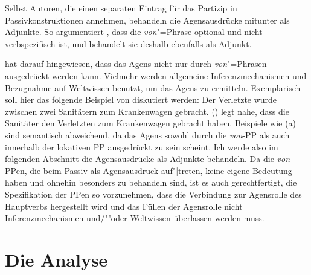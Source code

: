 Selbst Autoren, die einen separaten Eintrag für das Partizip in Passivkonstruktionen annehmen, behandeln
die Agensausdrücke mitunter als Adjunkte. So argumentiert \zb \citet[]{Zifonun92a}, dass die \emph{von}"=Phrase 
optional und nicht verbspezifisch ist, und behandelt sie deshalb ebenfalls als Adjunkt.


\citet[Kapitel~7]{Hoehle78a} hat darauf hingewiesen, dass das Agens nicht nur durch
\emph{von}"=Phrasen ausgedrückt werden kann. Vielmehr werden allgemeine Inferenzmechanismen und Bezugnahme auf
Weltwissen benutzt, um das Agens zu ermitteln. Exemplarisch soll hier das folgende Beispiel von \citet[]{Hoehle78a}
diskutiert werden:
\ea
Der Verletzte wurde zwischen zwei Sanitätern zum Krankenwagen gebracht.
\z
() legt nahe, dass die Sanitäter den Verletzten zum Krankenwagen gebracht haben.
Beispiele wie (a) sind semantisch abweichend, da das Agens sowohl
durch die \emph{von}-PP als auch innerhalb der lokativen PP ausgedrückt zu sein scheint.
\eal
\label{ex-sanitaeter}
\zl
Ich werde also im folgenden Abschnitt die Agensausdrücke als Adjunkte behandeln. Da
die \emph{von}-PPen, die beim Passiv als Agensausdruck auf"|treten, keine eigene Bedeutung
haben und ohnehin besonders zu behandeln sind, ist es auch gerechtfertigt, die Spezifikation
der PPen so vorzunehmen, dass die Verbindung zur Agensrolle des Hauptverbs hergestellt wird
und das Füllen der Agensrolle nicht Inferenzmechanismen und/""oder Weltwissen
überlassen werden muss.
 


\section{Die Analyse}
\label{sec-passive-anal}

